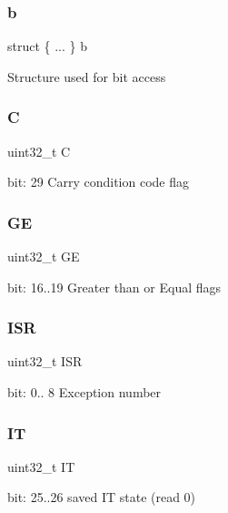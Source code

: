 \subsubsection{\texorpdfstring{b}{b}\hspace{0.1cm}{\footnotesize\ttfamily [4/4]}}
{\footnotesize\ttfamily struct \{ ... \}   b}

Structure used for bit access \mbox{\label{unionx_p_s_r___type_a7a1caf92f32fe9ebd8d1fe89b06c7776}} 
\subsubsection{\texorpdfstring{C}{C}}
{\footnotesize\ttfamily uint32\+\_\+t C}

bit\+: 29 Carry condition code flag \mbox{\label{unionx_p_s_r___type_aa91800ec6e90e457c7a1acd1f2e17099}} 
\subsubsection{\texorpdfstring{GE}{GE}}
{\footnotesize\ttfamily uint32\+\_\+t GE}

bit\+: 16..19 Greater than or Equal flags \mbox{\label{unionx_p_s_r___type_ad502ba7dbb2aab5f87c782b28f02622d}} 
\subsubsection{\texorpdfstring{ISR}{ISR}}
{\footnotesize\ttfamily uint32\+\_\+t I\+SR}

bit\+: 0.. 8 Exception number \mbox{\label{unionx_p_s_r___type_a76485660fe8ad98cdc71ddd7cb0ed777}} 
\subsubsection{\texorpdfstring{IT}{IT}}
{\footnotesize\ttfamily uint32\+\_\+t IT}

bit\+: 25..26 saved IT state (read 0) \mbox{\label{unionx_p_s_r___type_abae0610bc2a97bbf7f689e953e0b451f}} 
